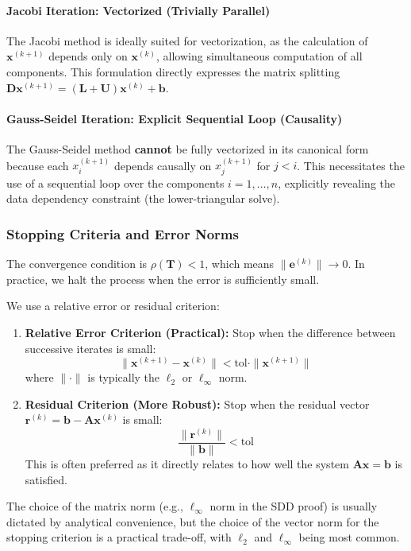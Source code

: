 \paragraph{Jacobi Iteration: Vectorized (Trivially Parallel)}
The Jacobi method is ideally suited for vectorization, as the calculation of $\mathbf{x}^{(k+1)}$ depends only on $\mathbf{x}^{(k)}$, allowing simultaneous computation of all components. This formulation directly expresses the matrix splitting $\mathbf{D}\mathbf{x}^{(k+1)} = (\mathbf{L}+\mathbf{U})\mathbf{x}^{(k)} + \mathbf{b}$.



\paragraph{Gauss-Seidel Iteration: Explicit Sequential Loop (Causality)}
The Gauss-Seidel method \textbf{cannot} be fully vectorized in its canonical form because each $x_i^{(k+1)}$ depends causally on $x_j^{(k+1)}$ for $j < i$. This necessitates the use of a sequential loop over the components $i = 1, \dots, n$, explicitly revealing the data dependency constraint (the lower-triangular solve).



\subsubsection{Stopping Criteria and Error Norms}

The convergence condition is $\rho(\mathbf{T}) < 1$, which means $\|\mathbf{e}^{(k)}\| \to 0$. In practice, we halt the process when the error is sufficiently small.

\begin{definition}
We use a relative error or residual criterion:
\begin{enumerate}
    \item \textbf{Relative Error Criterion (Practical):} Stop when the difference between successive iterates is small:
    \[ \|\mathbf{x}^{(k+1)} - \mathbf{x}^{(k)}\| < \mathrm{tol} \cdot \|\mathbf{x}^{(k+1)}\| \]
    where $\|\cdot\|$ is typically the $\ell_2$ or $\ell_{\infty}$ norm.
    \item \textbf{Residual Criterion (More Robust):} Stop when the residual vector $\mathbf{r}^{(k)} = \mathbf{b} - \mathbf{A}\mathbf{x}^{(k)}$ is small:
    \[ \frac{\|\mathbf{r}^{(k)}\|}{\|\mathbf{b}\|} < \mathrm{tol} \]
    This is often preferred as it directly relates to how well the system $\mathbf{A}\mathbf{x}=\mathbf{b}$ is satisfied.
\end{enumerate}
The choice of the matrix norm (e.g., $\ell_{\infty}$ norm in the SDD proof) is usually dictated by analytical convenience, but the choice of the vector norm for the stopping criterion is a practical trade-off, with $\ell_2$ and $\ell_{\infty}$ being most common.
\end{definition}